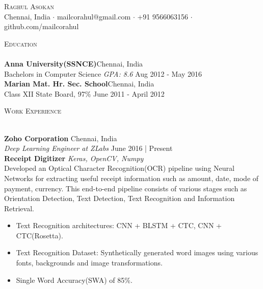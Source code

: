 \documentclass[a4paper]{article}
\newcommand{\lineunder} {
    \vspace*{-8pt} \\
    \hspace*{-18pt} \hrulefill \\
}
\newcommand{\header} [1] {
    {\hspace*{-18pt}\vspace*{6pt} \textsc{#1}}
    \vspace*{-6pt} \lineunder
}
\begin{document}
\vspace*{-40pt}

    

\vspace*{-10pt}
\begin{center}
	{\Huge \scshape {Raghul Asokan}}\\
	Chennai, India $\cdot$ mailcorahul@gmail.com $\cdot$ +91 9566063156 $\cdot$ github.com/mailcorahul\\
\end{center}

\header{Education}
\textbf{Anna University(SSNCE)}\hfill Chennai, India\\
Bachelor\textquotesingle{}s in Computer Science \textit{GPA: 8.6} \hfill Aug 2012 - May 2016\\
\vspace{2mm}
\textbf{Marian Mat. Hr. Sec. School}\hfill Chennai, India\\
Class XII State Board, 97\% \hfill June 2011 - April 2012\\
\vspace{2mm}

\header{Work Experience}
\vspace{1mm}

\textbf{Zoho Corporation} \hfill Chennai, India\\
\textit{Deep Learning Engineer at ZLabs} \hfill June 2016 | Present\\
\vspace*{2mm}
{\textbf{Receipt Digitizer}} {\sl Keras, OpenCV, Numpy} \\
Developed an Optical Character Recognition(OCR) pipeline using Neural Networks for extracting useful receipt information such as amount, date, mode of payment, currency. This end-to-end pipeline consists of various stages such as Orientation Detection, Text Detection, Text Recognition and Information Retrieval.\\            
            \begin{itemize}
                \itemsep-0.5em
                \item Text Recognition architectures: CNN + BLSTM + CTC, CNN + CTC(Rosetta).
                \item Text Recognition Dataset: Synthetically generated word images using various fonts, backgrounds and image transformations.
                \item Single Word Accuracy(SWA) of 85\%.
            \end{itemize}
\end{document}
